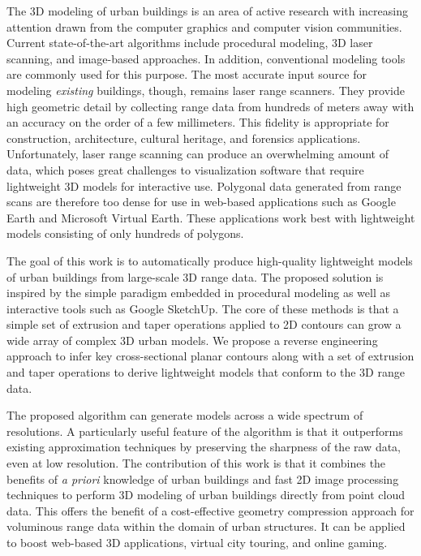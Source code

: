
The 3D modeling of urban buildings is an area of active research
with increasing attention drawn from the computer graphics and
computer vision communities.
Current state-of-the-art algorithms include procedural modeling,
3D laser scanning, and image-based approaches.
In addition, conventional modeling tools are commonly used for this purpose.
The most accurate input source for modeling {\it existing} buildings, though,
remains laser range scanners.
They provide high geometric detail by collecting range data from hundreds
of meters away with an accuracy on the order of a few millimeters.
This fidelity is appropriate for construction, architecture, cultural
heritage, and forensics applications.
Unfortunately, laser range scanning can produce an overwhelming amount of data,
which poses great challenges to visualization software that require lightweight
3D models for interactive use.
Polygonal data generated from range scans are therefore too dense for use in
web-based applications such as Google Earth and Microsoft Virtual Earth.
These applications work best with lightweight models consisting of only
hundreds of polygons.

The goal of this work is to automatically produce high-quality
lightweight models of urban buildings from large-scale 3D range data.
The proposed solution is inspired by the simple paradigm embedded in
procedural modeling as well as interactive tools such as Google SketchUp.
The core of these methods is that a simple set of extrusion and taper
operations applied to 2D contours can grow a wide array of complex 3D urban
models.
We propose a reverse engineering approach to infer key cross-sectional
planar contours along with a set of extrusion and taper operations to derive
lightweight models that conform to the 3D range data.

The proposed algorithm can generate models across a wide spectrum of
resolutions.
A particularly useful feature of the algorithm is that it outperforms
existing approximation techniques by preserving the sharpness of the raw
data, even at low resolution.
The contribution of this work is that it combines the benefits of
\emph{a priori} knowledge of urban buildings and fast 2D image
processing techniques to perform 3D modeling of urban buildings directly
from point cloud data.
This offers the benefit of a cost-effective geometry compression
approach for voluminous range data within the domain of urban structures.
It can be applied to boost web-based 3D applications, virtual city touring,
and online gaming.

